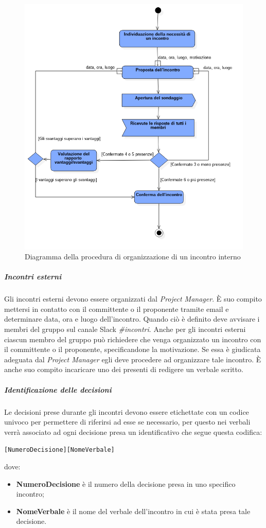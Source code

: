 \begin{figure}
	\centering
	\includegraphics[width=1\textwidth]{Images/umlincontri.png}
	\caption{Diagramma della procedura di organizzazione di un incontro interno}
\end{figure}

\subparagraph{Incontri esterni} \Spazio
Gli incontri esterni devono essere organizzati dal \emph{Project Manager}. È suo compito mettersi in contatto con il committente o il proponente tramite email e determinare data, ora e luogo dell'incontro. Quando ciò è definito deve avvisare i membri del gruppo sul canale Slack \emph{\#incontri}. Anche per gli incontri esterni ciascun membro del gruppo può richiedere che venga organizzato un incontro con il committente o il proponente, specificandone la motivazione. Se essa è giudicata adeguata dal \emph{Project Manager} egli deve procedere ad organizzare tale incontro. È anche suo compito incaricare uno dei presenti di redigere un verbale scritto.

\subparagraph{Identificazione delle decisioni} \Spazio
\label{sec:verbali}
Le decisioni prese durante gli incontri devono essere etichettate con un codice univoco per permettere di riferirsi ad esse se necessario, per questo nei verbali verrà associato ad ogni decisione presa un identificativo che segue questa codifica:
\begin{center}
	\texttt{[NumeroDecisione][NomeVerbale]}
\end{center}
dove:
\begin{itemize}
	\item \textbf{NumeroDecisione} è il numero della decisione presa in uno specifico incontro;
	\item \textbf{NomeVerbale} è il nome del verbale dell'incontro in cui è stata presa tale decisione.
\end{itemize}

